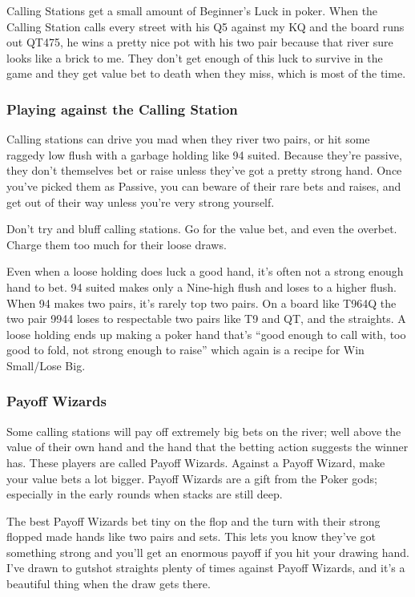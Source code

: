 Calling Stations get a small amount of Beginner's Luck in poker.
When the Calling Station calls every street with his Q5 against my KQ
and the board runs out QT475, he wins a pretty nice pot with his two pair
because that river sure looks like a brick to me. They don't get
enough of this luck to survive in the game and they get value bet to
death when they miss, which is most of the time.

\subsubsection{Playing against the Calling Station}

Calling stations can drive you mad when they river two pairs,
or hit some raggedy low flush with a garbage holding like 94 suited.
Because they're passive, they don't themselves bet or raise unless
they've got a pretty strong hand. Once you've picked them as
Passive, you can beware of their rare bets and raises, and get out of
their way unless you're very strong yourself.

Don't try and bluff calling stations. Go for the value bet,
and even the overbet. Charge them too much for their loose draws.

Even when a loose holding does luck a good hand, it's often
not a strong enough hand to bet. 94 suited makes only a Nine-high
flush and loses to a higher flush. When 94 makes two pairs,
it's rarely top two pairs. On a board like T964Q the two pair 9944
loses to respectable two pairs like T9 and QT, and the straights.
A loose holding ends up making a poker hand that's
``good enough to call with, too good to fold, not strong enough to
raise'' which again is a recipe for Win Small/Lose Big.

\subsubsection{Payoff Wizards}

Some calling stations will pay off extremely big bets on the river; well
above the value of their own hand and the hand that the betting action
suggests the winner has. These players are called Payoff
Wizards. Against a Payoff Wizard, make your value bets a
lot bigger. Payoff Wizards are a gift from the
Poker gods; especially in the early rounds when stacks are still
deep.

The best Payoff Wizards bet tiny on the flop and the
turn with their strong flopped made hands like two pairs and sets.
This lets you know they've got something strong and you'll
get an enormous payoff if you hit your drawing hand. I've drawn to
gutshot straights plenty of times against Payoff Wizards, and it's a
beautiful thing when the draw gets there.

